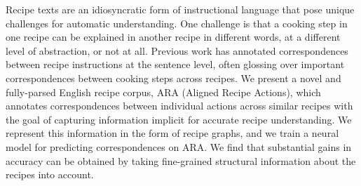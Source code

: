Recipe texts are an idiosyncratic form of instructional language that pose unique challenges for automatic understanding. One challenge is that a cooking step in one recipe can be explained in another recipe in different words, at a different level of abstraction, or not at all. Previous work has annotated correspondences between recipe instructions at the sentence level, often glossing over important correspondences between cooking steps across recipes. We present a novel and fully-parsed English recipe corpus, ARA (Aligned Recipe Actions), which annotates correspondences between individual actions across similar recipes with the goal of capturing information implicit for accurate recipe understanding. We represent this information in the form of recipe graphs, and we train a neural model for predicting correspondences on ARA. We find that substantial gains in accuracy can be obtained by taking fine-grained structural information about the recipes into account.
